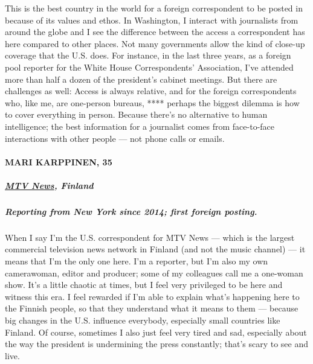 This is the best country in the world for a foreign correspondent to be
posted in because of its values and ethos. In Washington, I interact
with journalists from around the globe and I see the difference between
the access a correspondent has here compared to other places. Not many
governments allow the kind of close-up coverage that the U.S. does. For
instance, in the last three years, as a foreign pool reporter for the
White House Correspondents' Association, I've attended more than half a
dozen of the president's cabinet meetings. But there are challenges as
well: Access is always relative, and for the foreign correspondents who,
like me, are one-person bureaus, **** perhaps the biggest dilemma is how
to cover everything in person. Because there's no alternative to human
intelligence; the best information for a journalist comes from
face-to-face interactions with other people --- not phone calls or
emails.

\hypertarget{mari-karppinen-35}{%
\paragraph{MARI KARPPINEN, 35}\label{mari-karppinen-35}}

\hypertarget{mtv-news-finland}{%
\subparagraph{\texorpdfstring{\textbf{\href{https://www.mtvuutiset.fi/}{MTV
News}, Finland}}{MTV News, Finland}}\label{mtv-news-finland}}

\hypertarget{reporting-from-new-york-since-2014-first-foreign-posting}{%
\subparagraph{\texorpdfstring{\textbf{Reporting from New York since
2014; first foreign
posting.}}{Reporting from New York since 2014; first foreign posting.}}\label{reporting-from-new-york-since-2014-first-foreign-posting}}

When I say I'm the U.S. correspondent for MTV News --- which is the
largest commercial television news network in Finland (and not the music
channel) --- it means that I'm the only one here. I'm a reporter, but
I'm also my own camerawoman, editor and producer; some of my colleagues
call me a one-woman show. It's a little chaotic at times, but I feel
very privileged to be here and witness this era. I feel rewarded if I'm
able to explain what's happening here to the Finnish people, so that
they understand what it means to them --- because big changes in the
U.S. influence everybody, especially small countries like Finland. Of
course, sometimes I also just feel very tired and sad, especially about
the way the president is undermining the press constantly; that's scary
to see and live.

